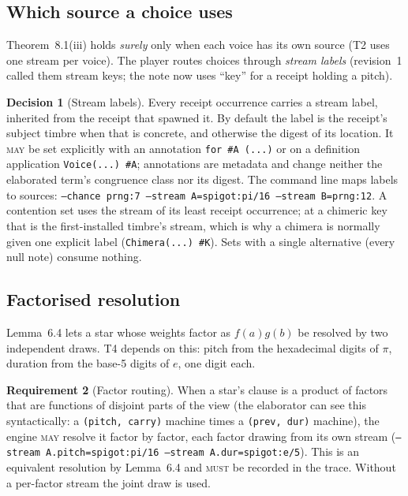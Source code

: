 \documentclass[11pt,a4paper]{article}
\theoremstyle{definition}
\newtheorem{requirement}{Requirement}[section]
\newtheorem{decision}[requirement]{Decision}
\theoremstyle{remark}
\newcommand{\MUST}{\textsc{must}}
\newcommand{\MAY}{\textsc{may}}
\begin{document}
\subsection{Which source a choice uses}

Theorem~8.1(iii) holds \emph{surely} only when each voice has its own source
(T2 uses one stream per voice). The player routes choices through \emph{stream
labels} (revision~1 called them stream keys; the note now uses ``key'' for a
receipt holding a pitch).

\begin{decision}[Stream labels]\label{dec:streams}
Every receipt occurrence carries a stream label, inherited from the receipt that
spawned it. By default the label is the receipt's subject timbre when that is
concrete, and otherwise the digest of its location. It \MAY{} be set explicitly
with an annotation \texttt{for \#A (...)} or on a definition application
\texttt{Voice(...) \#A}; annotations are metadata and change neither the
elaborated term's congruence class nor its digest. The command line maps labels
to sources: \texttt{--chance prng:7 --stream A=spigot:pi/16 --stream B=prng:12}.
A contention set uses the stream of its least receipt occurrence; at a chimeric
key that is the first-installed timbre's stream, which is why a chimera is
normally given one explicit label (\texttt{Chimera(...) \#K}). Sets with a
single alternative (every null note) consume nothing.
\end{decision}

\subsection{Factorised resolution}

Lemma~6.4 lets a star whose weights factor as $f(a)g(b)$ be resolved by two
independent draws. T4 depends on this: pitch from the hexadecimal digits of
$\pi$, duration from the base-5 digits of $e$, one digit each.

\begin{requirement}[Factor routing]\label{req:factor}
When a star's clause is a product of factors that are functions of disjoint
parts of the view (the elaborator can see this syntactically: a
\texttt{(pitch, carry)} machine times a \texttt{(prev, dur)} machine), the
engine \MAY{} resolve it factor by factor, each factor drawing from its own
stream (\texttt{--stream A.pitch=spigot:pi/16 --stream A.dur=spigot:e/5}). This
is an equivalent resolution by Lemma~6.4 and \MUST{} be recorded in the trace.
Without a per-factor stream the joint draw is used.
\end{requirement}
\end{document}
